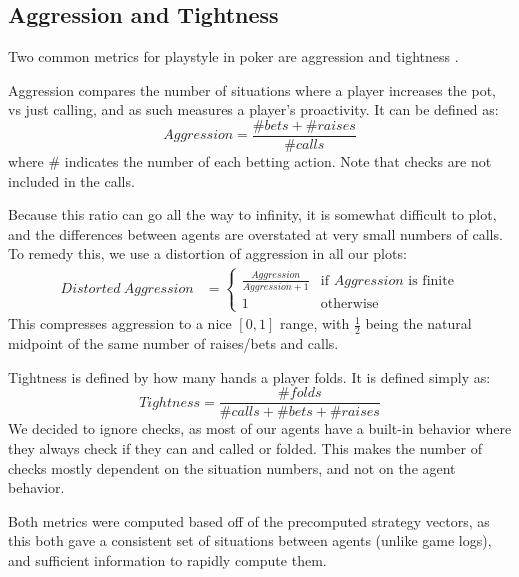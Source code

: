
\subsection{Aggression and Tightness}

Two common metrics for playstyle in poker are aggression and tightness \cite{PokerStrategy}.

Aggression compares the number of situations where a player increases the pot, vs just calling, and as such measures a player's proactivity. It can be defined as:
\begin{equation}
    Aggression = \frac{\# bets + \# raises}{\# calls}
\end{equation} where \# indicates the number of each betting action. Note that checks are not included in the calls.

Because this ratio can go all the way to infinity, it is somewhat difficult to plot, and the differences between agents are overstated at very small numbers of calls. To remedy this, we use a distortion of aggression in all our plots:
\begin{equation}
\begin{split}
Distorted\ Aggression &= \begin{cases}
\frac{Aggression}{Aggression + 1} &\mbox{if }Aggression\mbox{ is finite} \\
1 &\mbox{otherwise}
\end{cases}
\end{split}
\end{equation}
This compresses aggression to a nice $[0, 1]$ range, with $\frac{1}{2}$ being the natural midpoint of the same number of raises/bets and calls. 

Tightness is defined by how many hands a player folds. It is defined simply as:
\begin{equation}
    Tightness = \frac{\# folds}{\# calls + \# bets + \# raises}
\end{equation}
We decided to ignore checks, as most of our agents have a built-in behavior where they always check if they can and called or folded. This makes the number of checks mostly dependent on the situation numbers, and not on the agent behavior.

Both metrics were computed based off of the precomputed strategy vectors, as this both gave a consistent set of situations between agents (unlike game logs), and sufficient information to rapidly compute them.
